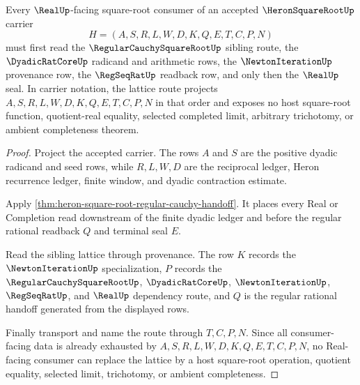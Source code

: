 \begin{theorem}
\label{thm:heron-square-root-regular-cauchy-regseqrat-lattice}
Every $\RealUp$-facing square-root consumer of an accepted $\HeronSquareRootUp$ carrier
$$
H=(A,S,R,L,W,D,K,Q,E,T,C,P,N)
$$
must first read the $\RegularCauchySquareRootUp$ sibling route, the $\DyadicRatCoreUp$ radicand and arithmetic rows, the $\NewtonIterationUp$ provenance row, the $\RegSeqRatUp$ readback row, and only then the $\RealUp$ seal. In carrier notation, the lattice route projects $A,S,R,L,W,D,K,Q,E,T,C,P,N$ in that order and exposes no host square-root function, quotient-real equality, selected completed limit, arbitrary trichotomy, or ambient completeness theorem.
\end{theorem}
\begin{proof}
Project the accepted carrier. The rows $A$ and $S$ are the positive dyadic radicand and seed rows, while $R,L,W,D$ are the reciprocal ledger, Heron recurrence ledger, finite window, and dyadic contraction estimate.

Apply \autoref{thm:heron-square-root-regular-cauchy-handoff}. It places every Real or Completion read downstream of the finite dyadic ledger and before the regular rational readback $Q$ and terminal seal $E$.

Read the sibling lattice through provenance. The row $K$ records the $\NewtonIterationUp$ specialization, $P$ records the $\RegularCauchySquareRootUp$, $\DyadicRatCoreUp$, $\NewtonIterationUp$, $\RegSeqRatUp$, and $\RealUp$ dependency route, and $Q$ is the regular rational handoff generated from the displayed rows.

Finally transport and name the route through $T,C,P,N$. Since all consumer-facing data is already exhausted by $A,S,R,L,W,D,K,Q,E,T,C,P,N$, no Real-facing consumer can replace the lattice by a host square-root operation, quotient equality, selected limit, trichotomy, or ambient completeness.
\end{proof}


